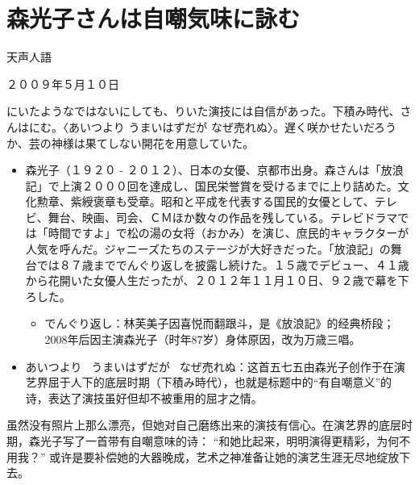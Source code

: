 \documentclass{ctexart}
\begin{document}
\section*{\gothic 森光子さんは自嘲気味に詠む}

\begin{center}
    \mincho
    天声人語

    ２００９年５月１０日
\end{center}



\mincho
{}にいたようなではないにしても、りいた演技には自信があった。下積み時代、さんはにむ。〈あいつより うまいはずだが なぜ売れぬ〉。遅く咲かせたいだろうか、芸の神様は果てしない開花を用意していた。

\begin{itemize}
    \mincho
    \item 森光子（１９２０ - ２０１２）、日本の女優、京都市出身。森さんは「放浪記」で上演２０００回を達成し、国民栄誉賞を受けるまでに上り詰めた。文化勲章、紫綬褒章も受章。昭和と平成を代表する国民的女優として、テレビ、舞台、映画、司会、ＣＭほか数々の作品を残している。テレビドラマでは「時間ですよ」で松の湯の女将（おかみ）を演じ、庶民的キャラクターが人気を呼んだ。ジャニーズたちのステージが大好きだった。「放浪記」の舞台では８７歳まででんぐり返しを披露し続けた。１５歳でデビュー、４１歳から花開いた女優人生だったが、２０１２年１１月１０日、９２歳で幕を下ろした。
    \rmfamily
    \begin{itemize}
        \item \mincho でんぐり返し：\rmfamily 林芙美子因喜悦而翻跟斗，是《放浪記》的经典桥段；2008年后因主演森光子（时年87岁）身体原因，改为万歳三唱。
    \end{itemize}
    \item \mincho あいつより \ うまいはずだが \ なぜ売れぬ：\rmfamily 这首五七五由森光子创作于在演艺界屈于人下的底层时期（下積み時代），也就是标题中的“有自嘲意义”的诗，表达了演技虽好但却不被重用的屈才之情。
\end{itemize}

\rmfamily
虽然没有照片上那么漂亮，但她对自己磨练出来的演技有信心。在演艺界的底层时期，森光子写了一首带有自嘲意味的诗： “和她比起来，明明演得更精彩，为何不用我？” 或许是要补偿她的大器晚成，艺术之神准备让她的演艺生涯无尽地绽放下去。
\end{document}
